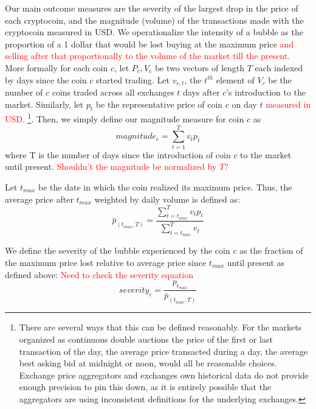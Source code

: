 Our main outcome measures are the severity of the largest drop in the price of each cryptocoin, and the magnitude (volume) of the transactions made with the cryptocoin measured in USD.
We operationalize the intensity of a bubble as the proportion of a 1 dollar that would be lost buying at the maximum price \textcolor{red}{and selling after that proportionally to the volume of the market till the present.}
More formally for each coin $c$, let $P_c,V_c$ be two vectors of length $T$ each indexed by days since the coin $c$ started trading.
Let $v_{c,t}$, the $t^{th}$ element of $V_c$ be the number of $c$ coins traded across all exchanges $t$ days after $c$'s introduction to the market. 
Similarly, let $p_t$ be the representative price of coin $c$ on day $t$ \textcolor{red}{measured in USD}. \footnote{There are several ways that this can be defined reasonably. For the markets organized as continuous double auctions the price of the first or last transaction of the day,  the average price transacted during a day, the average best asking bid at midnight or noon, would all be reasonable choices. Exchange price aggregators and exchanges own historical data do not provide enough precision to pin this down, as it is entirely possible that the aggregators are using inconsistent definitions for the underlying exchanges.}. Then, we simply define our magnitude measure for coin $c$ as
\begin{equation}
magnitude_{c} = \sum_{t=1}^{T} v_t  p_t
\end{equation}
where T is the number of days since the introduction of coin $c$ to the market until present. \textcolor{red}{Shouldn't the magnitude be normalized by $T$?}


Let $t_{max}$ be the date in which the coin realized its maximum price. Thus, the average price after $t_{max}$ weighted by daily volume is defined as:
\begin{equation}
\bar{p}_{(t_{max},T)} = \frac{\sum_{t=t_{max}}^{T} v_t p_t} {\sum_{t=t_{max}}^{T} v_t}
\end{equation}

We define the severity of the bubble experienced by the coin $c$ as the fraction of the maximum price lost relative to average price since $t_{max}$ until present as defined above: \textcolor{red}{Need to check the severity equation}
\begin{equation}
severity_{c} = \frac{ p_{t_{max}}} {\bar{p}_{(t_{max},T)} }
\end{equation}
